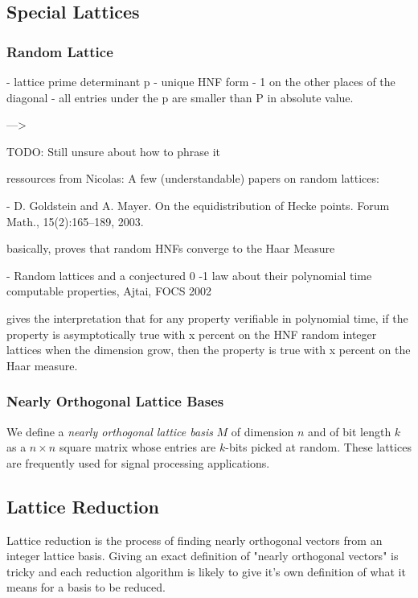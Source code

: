 \documentclass[10pt, a4paper]{article}
\begin{document}
\subsection{Special Lattices}

\subsubsection{Random Lattice}





- lattice prime determinant p 
- unique HNF form
- 1 on the other places of the diagonal
- all entries under the p are smaller than P in absolute value.

---> 

TODO: Still unsure about how to phrase it

ressources from Nicolas:
A few (understandable) papers on random lattices:

- D. Goldstein and A. Mayer. On the equidistribution of Hecke points.
Forum Math., 15(2):165–189, 2003.

basically, proves that random HNFs converge to the Haar Measure

- Random lattices and a conjectured 0 -1 law about their polynomial time
computable properties, Ajtai, FOCS 2002

gives the interpretation that for any property verifiable in polynomial
time,
if the property is asymptotically true with x percent on the HNF random
integer lattices when the dimension grow,
then the property is true with x percent on the Haar measure.

\subsubsection{Nearly Orthogonal Lattice Bases}

We define a \emph{nearly orthogonal lattice basis} $M$ of dimension $n$ and of bit length $k$ as a $n \times n$ square matrix whose entries are $k$-bits picked at random. These lattices are frequently used for signal processing applications\cite{originalJacobiMethodLatticeBasisReduction}.

\subsection{Lattice Reduction}

Lattice reduction is the process of finding nearly orthogonal vectors from an integer lattice basis. Giving an exact definition of "nearly orthogonal vectors" is tricky and each reduction algorithm is likely to give it's own definition of what it means for a basis to be reduced.
\end{document}
